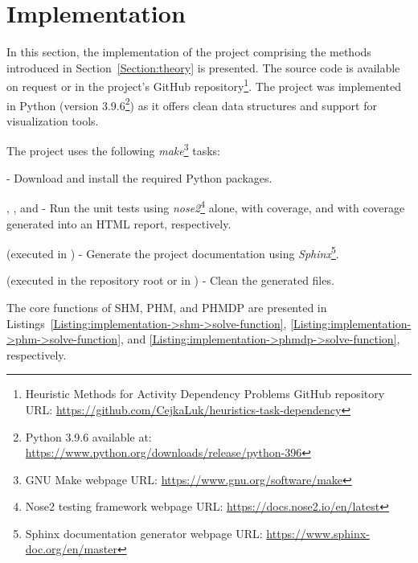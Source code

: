 \setcounter{footnote}{3} %
\section{Implementation}
In this section, the implementation of the project comprising the methods introduced in Section~\ref{Section:theory} is presented.
The source code is available on request or in the project's GitHub repository\footnote{Heuristic Methods for Activity Dependency Problems GitHub repository URL: \url{https://github.com/CejkaLuk/heuristics-task-dependency}}.
The project was implemented in Python (version 3.9.6\footnote{Python 3.9.6 available at: \url{https://www.python.org/downloads/release/python-396}}) as it offers clean data structures and support for visualization tools.

The project uses the following \textit{make}\footnote{GNU Make webpage URL: \url{https://www.gnu.org/software/make}} tasks:

\begin{tight_itemize}
	\item {} - Download and install the required Python packages.
	\item {}, , and  - Run the unit tests using \textit{nose2}\footnote{Nose2 testing framework webpage URL: \url{https://docs.nose2.io/en/latest}} alone, with coverage, and with coverage generated into an HTML report, respectively.
	\item {} (executed in ) - Generate the project documentation using \textit{Sphinx}\footnote{Sphinx documentation generator webpage URL: \url{https://www.sphinx-doc.org/en/master}}.
	\item {} (executed in the repository root or in ) - Clean the generated files.
\end{tight_itemize}

The core functions of SHM, PHM, and PHMDP are presented in Listings~\ref{Listing:implementation->shm->solve-function}, \ref{Listing:implementation->phm->solve-function}, and \ref{Listing:implementation->phmdp->solve-function}, respectively.

